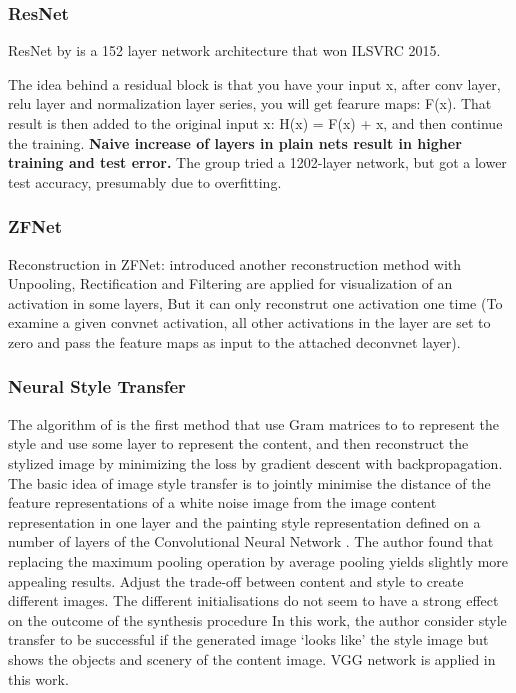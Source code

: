 \documentclass[a4paper,11pt]{article}
\begin{document}
\subsubsection{ResNet}
ResNet by \cite{he2016deep} is a 152 layer network architecture that won ILSVRC 2015.
\begin{outline}
\1 The idea behind a residual block is that you have your input x, after conv layer, relu layer and normalization layer series, you will get fearure maps: F(x). That result is then added to the original input x: H(x) = F(x) + x, and then continue the training.
\1 \textbf{Naive increase of layers in plain nets result in higher training and test error.}
\1 The group tried a 1202-layer network, but got a lower test accuracy, presumably due to overfitting.
\end{outline}
\subsubsection{ZFNet}
\begin{outline}
\1 Reconstruction in ZFNet: \cite{zeiler2014visualizing} introduced another reconstruction method with Unpooling, Rectification and Filtering are applied for visualization of an activation in some layers, But it can only reconstrut one activation one time (To examine a given convnet activation, all other activations in the layer are set to zero and pass the feature maps as input to the attached deconvnet layer).
\end{outline}

\subsubsection{Neural Style Transfer}
The algorithm of \cite{gatys2016image} is the first method that use Gram matrices to to represent the style and use some layer to represent the content, and then reconstruct the stylized image by minimizing the loss by gradient descent with backpropagation. The basic idea of image style transfer is to jointly minimise the distance of the feature representations of a white noise image from the image content representation in one layer and the painting style representation defined on a number of layers of the Convolutional Neural Network . The author found that replacing the maximum pooling operation by average pooling yields slightly more appealing results. Adjust the trade-off between content and style to create different images. The different initialisations do not seem to have a strong effect on the outcome of the synthesis procedure In this work, the author consider style transfer to be successful if the generated image ‘looks like’ the style image but shows the objects and scenery of the content image. VGG network is applied in this work.
\end{document}
